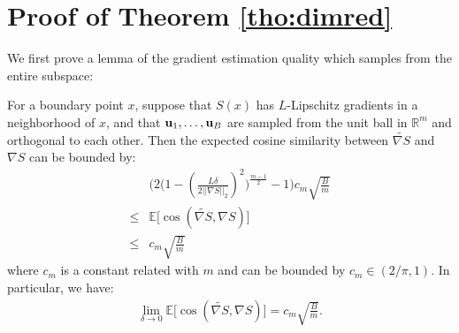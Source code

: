 \section{Proof of Theorem \ref{tho:dimred}}
\label{sec:tho-proof}
We first prove a lemma of the gradient estimation quality which samples from the entire subspace:
\begin{lemma}
\label{lemma:cos}
For a boundary point $x$, suppose that $S(x)$ has $L$-Lipschitz gradients in a neighborhood of $x$, and that ${\bf u}_1, \ldots, {\bf u}_B$ are sampled from the unit ball in $\mathbb{R}^m$ and orthogonal to each other. Then the expected cosine similarity between $\widetilde{\nabla S}$ and $\nabla S$ can be bounded by:
\begin{align}
    & \bigg( 2\bigg(1-(\frac{L\delta}{2||\nabla S||_2})^2\bigg)^{\frac{m-1}{2}} - 1 \bigg)c_m\sqrt{\frac B m}\\
    \leq & \mathbb{E}\big[\cos (\widetilde{\nabla S}, \nabla S) \big]\\
    \leq & c_m\sqrt{\frac B m}
\end{align}
where $c_m$ is a constant related with $m$ and can be bounded by $c_m \in (2/\pi, 1)$. In particular, we have:
\begin{align}
    \label{eqn:grad-est-qual}
    \lim_{\delta\rightarrow 0}\mathbb{E}\big[\cos (\widetilde{\nabla S}, \nabla S) \big] = c_m\sqrt{\frac B m}.
\end{align}
\end{lemma}

